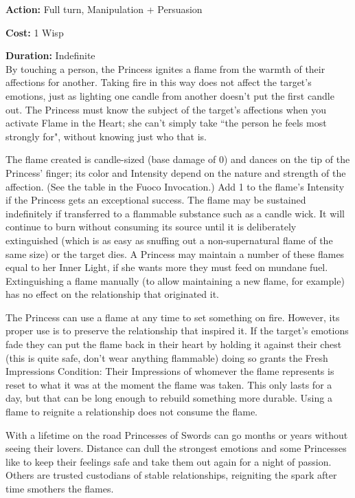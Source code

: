 \noindent \textbf{Action:} Full turn, Manipulation + Persuasion

\noindent \textbf{Cost:} 1 Wisp

\noindent \textbf{Duration:} Indefinite \\

\noindent By touching a person, the Princess ignites a flame from the warmth of their affections for another. Taking fire in this way does not affect the target's emotions, just as lighting one candle from another doesn't put the first candle out. The Princess must know the subject of the target's affections when you activate Flame in the Heart; she can't simply take \textquotedblleft the person he feels most strongly for", without knowing just who that is.

The flame created is candle-sized (base damage of 0) and dances on the tip of the Princess' finger; its color and Intensity depend on the nature and strength of the affection. (See the table in the Fuoco Invocation.) Add 1 to the flame's Intensity if the Princess gets an exceptional success. The flame may be sustained indefinitely if transferred to a flammable substance such as a candle wick. It will continue to burn without consuming its source until it is deliberately extinguished (which is as easy as snuffing out a non-supernatural flame of the same size) or the target dies. A Princess may maintain a number of these flames equal to her Inner Light, if she wants more they must feed on mundane fuel. Extinguishing a flame manually (to allow maintaining a new flame, for example) has no effect on the relationship that originated it.

The Princess can use a flame at any time to set something on fire. However, its proper use is to preserve the relationship that inspired it. If the target's emotions fade they can put the flame back in their heart by holding it against their chest (this is quite safe, don't wear anything flammable) doing so grants the Fresh Impressions Condition: Their Impressions of whomever the flame represents is reset to what it was at the moment the flame was taken. This only lasts for a day, but that can be long enough to rebuild something more durable. Using a flame to reignite a relationship does not consume the flame.

With a lifetime on the road Princesses of Swords can go months or years without seeing their lovers. Distance can dull the strongest emotions and some Princesses like to keep their feelings safe and take them out again for a night of passion. Others are trusted custodians of stable relationships, reigniting the spark after time smothers the flames. 

